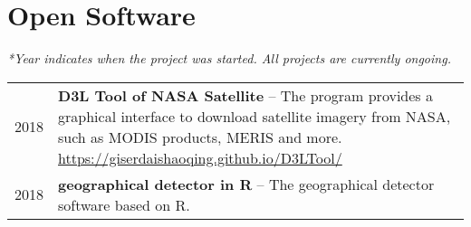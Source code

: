 \section*{Open Software}

\textit{*Year indicates when the project was started. All projects are currently ongoing.}

\begin{tabular}{p{} p{}}
2018 & \textbf{D3L Tool of NASA Satellite} -- The program provides a graphical interface to download satellite imagery from NASA, such as MODIS products, MERIS and more. \newline
       \url{https://giserdaishaoqing.github.io/D3LTool/} \\
2018 & \textbf{geographical detector in R} -- The geographical detector software based on R.\\
\end{tabular}

